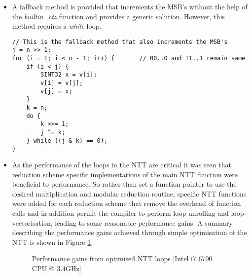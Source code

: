 \begin{itemize}
  \item A fallback method is provided that increments the MSB's without the help of the \textit{builtin\_ctz} function and provides a generic solution. However, this method requires a \textit{while} loop.

\begin{verbatim}
// This is the fallback method that also increments the MSB's
j = n >> 1;
for (i = 1; i < n - 1; i++) {       // 00..0 and 11..1 remain same
    if (i < j) {
        SINT32 x = v[i];
        v[i] = v[j];
        v[j] = x;
    }
    k = n;
    do {
        k >>= 1;
        j ^= k;
    } while ((j & k) == 0);
}
\end{verbatim}

  \item As the performance of the loops in the NTT are critical it was seen that reduction scheme specific implementations of the main NTT function were beneficial to performance. So rather than set a function pointer to use the desired multiplication and modular reduction routine, specific NTT functions were added for each reduction scheme that remove the overhead of function calls and in addition permit the compiler to perform loop unrolling and loop vectorisation, leading to some reasonable performance gains. A summary describing the performance gains achieved through simple optimisation of the NTT is shown in Figure \ref{fig:bliss_b_optimised_ntt}.

\pgfplotsset{compat=1.13,width=11cm,height=9cm}
\begin{figure}[ht!]
\centering
{}
\caption{Performance gains from optimised NTT loops [Intel i7 6700 CPU @ 3.4GHz]}
\label{fig:bliss_b_optimised_ntt}
\end{figure}


\end{itemize}
